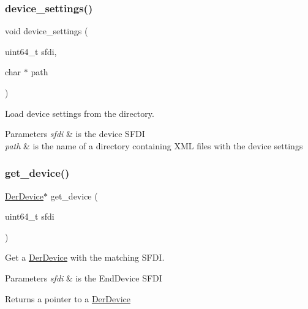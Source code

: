\subsubsection{\texorpdfstring{device\+\_\+settings()}{device\_settings()}}
{\footnotesize\ttfamily void device\+\_\+settings (\begin{DoxyParamCaption}\item[{uint64\+\_\+t}]{sfdi,  }\item[{char $\ast$}]{path }\end{DoxyParamCaption})}



Load device settings from the directory. 


\begin{DoxyParams}{Parameters}
{\em sfdi} & is the device S\+F\+DI \\
\hline
{\em path} & is the name of a directory containing X\+ML files with the device settings \\
\hline
\end{DoxyParams}
\mbox{\label{group__der_ga8c23c07a7eb3a5b0d9896d8b771aa34c}} 
\subsubsection{\texorpdfstring{get\+\_\+device()}{get\_device()}}
{\footnotesize\ttfamily \hyperlink{structDerDevice}{Der\+Device}$\ast$ get\+\_\+device (\begin{DoxyParamCaption}\item[{uint64\+\_\+t}]{sfdi }\end{DoxyParamCaption})}



Get a \hyperlink{structDerDevice}{Der\+Device} with the matching S\+F\+DI. 


\begin{DoxyParams}{Parameters}
{\em sfdi} & is the End\+Device S\+F\+DI \\
\hline
\end{DoxyParams}
\begin{DoxyReturn}{Returns}
a pointer to a \hyperlink{structDerDevice}{Der\+Device} 
\end{DoxyReturn}
\mbox{\label{group__der_gacd4c1d7510184ea16d1727e84d44b098}} 

